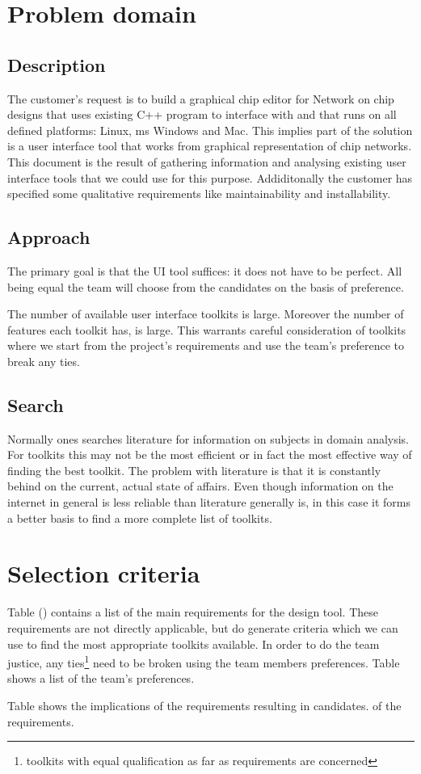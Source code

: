 \section{Problem domain}
\subsection{Description}

The customer's request is to build a graphical chip editor for Network on chip
designs that uses existing C++ program to interface with and that runs on all
defined platforms: Linux, ms Windows and Mac. This implies part of the solution
is a user interface tool that works from graphical representation of chip
networks. This document is the result of gathering information and analysing
existing user interface tools that we could use for this purpose. Addiditonally
the customer has specified some qualitative requirements like maintainability
and installability.

\subsection{Approach}

The primary goal is that the UI tool suffices: it does not have to be perfect.
All being equal the team will choose from the candidates on the basis of
preference.

The number of available user interface toolkits is large.  Moreover the number
of features each toolkit has, is large. This warrants careful consideration
of toolkits where we start from the project's requirements and use the team's 
preference to break any ties.

\subsection{Search}

Normally ones searches literature for information on subjects in domain
analysis.  For toolkits this may not be the most efficient or in fact the most
effective way of finding the best toolkit. The problem with literature is that
it is constantly behind on the current, actual state of affairs. Even though
information on the internet in general is less reliable than literature
generally is, in this case it forms a better basis to find a more complete list
of toolkits. 

\section{Selection criteria}

Table () contains a list of the main requirements for the design tool.
These requirements are not directly applicable, but do generate criteria which we 
can use to find the most appropriate toolkits available. In order to do the team 
justice, any ties\footnote{toolkits with equal qualification as far as requirements are concerned} need to be broken using the team members preferences. Table  
shows a list of the team's preferences.

Table  shows the implications of the requirements resulting in  
candidates. 
of the requirements.

